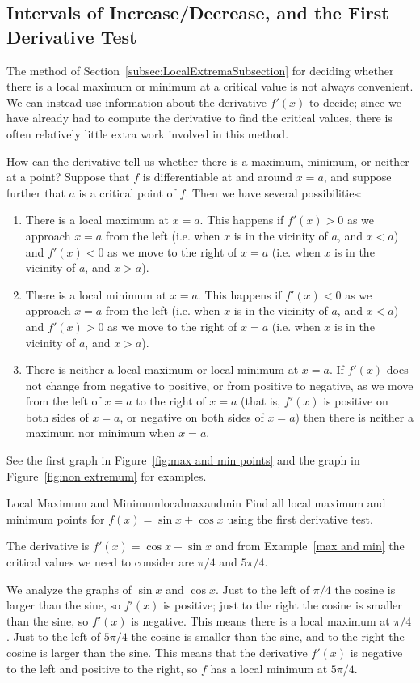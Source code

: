 \subsection{Intervals of Increase/Decrease, and the First Derivative Test}\label{sec:FirstDer}
The method of Section~\ref{subsec:LocalExtremaSubsection} for deciding whether there is a
local maximum or minimum at a critical value is not always
convenient. We can instead use information about the derivative
$f'(x)$ to decide; since we have already had to compute the derivative
to find the critical values, there is often relatively little extra
work involved in this method.

How can the derivative tell us whether there is a maximum, minimum, or
neither at a point? Suppose that $f$ is differentiable at and around $x=a$, and suppose further that $a$ is a critical point of $f$. Then we have several possibilities:
\begin{enumerate}
\item	There is a local maximum at $x=a$. This happens if $f'(x)>0$ as we approach $x=a$ from the left (i.e. when $x$ is in the vicinity of $a$, and $x<a$) and $f'(x)<0$ as we move to the right of $x=a$ (i.e. when $x$ is in the vicinity of $a$, and $x>a$).
\item	There is a local minimum at $x=a$. This happens if $f'(x)<0$ as we approach $x=a$ from the left (i.e. when $x$ is in the vicinity of $a$, and $x<a$) and $f'(x)>0$ as we move to the right of $x=a$ (i.e. when $x$ is in the vicinity of $a$, and $x>a$).
\item	There is neither a local maximum or local minimum at $x=a$. If $f'(x)$ does not change from negative to positive, or from positive to negative, as we move from the left of $x=a$ to the right of $x=a$ (that is, $f'(x)$ is positive on both sides of $x=a$, or negative on both sides of $x=a$) then there is neither a maximum nor minimum when $x=a$.
\end{enumerate}
See the first graph in Figure~\ref{fig:max and min points}
and the graph in Figure~\ref{fig:non extremum}
for examples.

\begin{example}{Local Maximum and Minimum}{localmaxandmin}
Find all local maximum and minimum points for $f(x)=\sin x+\cos
x$ using the first derivative test.  
\end{example}

\begin{solution} 
The derivative is $f'(x)=\cos
x-\sin x$ and from Example~\ref{max and min} the critical
values we need to consider are $\pi/4$ and $5\pi/4$.

We analyze the graphs of $\sin x$ and $\cos x$.
Just to the left of $\pi/4$ the cosine is larger than the
  sine, so $f'(x)$ is positive; just to the right the cosine is
  smaller than the sine, so $f'(x)$ is negative. This means there is a
  local maximum at $\pi/4$. Just to the left of $5\pi/4$ the cosine is
  smaller than the sine, and to the right the cosine is larger than
  the sine. This means that the derivative $f'(x)$ is negative to the
  left and positive to the right, so $f$ has a local minimum at
  $5\pi/4$.
\end{solution}

